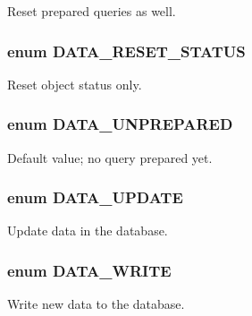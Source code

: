 Reset prepared queries as well. 

\hypertarget{class_8datahandler_8php_9266811d651cb3ff8c5fdf00111e677b}{
\subsubsection{\setlength{\rightskip}{0pt plus 5cm}enum {\bf DATA\_\-RESET\_\-STATUS}}}
\label{class_8datahandler_8php_9266811d651cb3ff8c5fdf00111e677b}


Reset object status only. 

\hypertarget{class_8datahandler_8php_21c8184f96d445f8f608321e0e8fffc9}{
\subsubsection{\setlength{\rightskip}{0pt plus 5cm}enum {\bf DATA\_\-UNPREPARED}}}
\label{class_8datahandler_8php_21c8184f96d445f8f608321e0e8fffc9}


Default value; no query prepared yet. 

\hypertarget{class_8datahandler_8php_9a817a8e9190bfc1eb884f9b4c3cb7c8}{
\subsubsection{\setlength{\rightskip}{0pt plus 5cm}enum {\bf DATA\_\-UPDATE}}}
\label{class_8datahandler_8php_9a817a8e9190bfc1eb884f9b4c3cb7c8}


Update data in the database. 

\hypertarget{class_8datahandler_8php_5d8b54a2eb4767a05a2e577c2db9193a}{
\subsubsection{\setlength{\rightskip}{0pt plus 5cm}enum {\bf DATA\_\-WRITE}}}
\label{class_8datahandler_8php_5d8b54a2eb4767a05a2e577c2db9193a}


Write new data to the database. 

